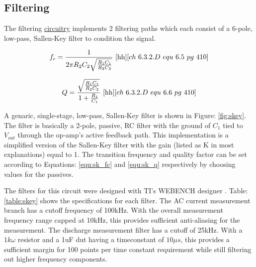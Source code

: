 \subsection{Filtering}
\label{sec:filtering}
\nocite{kirk_skey}

The filtering \hyperlink{sch:filtering}{circuitry} implements 2 filtering paths which each consist of a 6-pole, low-pass, Sallen-Key filter to condition the signal.



\begin{equation}
    \label{equ:sk_fc}
    f_c = \frac{1}{2\pi R_2C_2\sqrt{\frac{R_1C_1}{R_2C_2}}}
    ~\cite{hh}[ch~6.3.2.D~equ~6.5~pg~410]
\end{equation}

\begin{equation}
    \label{equ:sk_q}
    Q = \frac{\sqrt{\frac{R_1C_1}{R_2C_2}}}{1 + \frac{R_1}{C_1}}
    ~\cite{hh}[ch~6.3.2.D~equ~6.6~pg~410]
\end{equation}

A genaric, single-stage, low-pass, Sallen-Key filter is shown in Figure: \ref{fig:skey}. The filter is basically a 2-pole, passive, RC filter with the ground of $C_1$ tied to $V_{out}$ through the op-amp's active feedback path. This implementation is a simplified version of the Sallen-Key filter with the gain (listed as K in most explanations) equal to 1. The transition frequency and quality factor can be set according to Equations: \eqref{equ:sk_fc} and \eqref{equ:sk_q} respectively by choosing values for the passives.



The filters for this circuit were designed with TI's WEBENCH designer \cite{webench}. Table: \ref{table:skey} shows the specifications for each filter. 
The AC current measurement branch has a cutoff frequency of 100kHz. With the overall measurement frequency range capped at 10kHz, this provides sufficient anti-aliasing for the measurement. The discharge measurement filter has a cutoff of 25kHz. With a $1k\omega$ resistor and a 1uF \gls{dut} having a timeconstant of $10\mu s$, this provides a sufficient margin for 100 points per time constant requirement while still filtering out higher frequency components.

